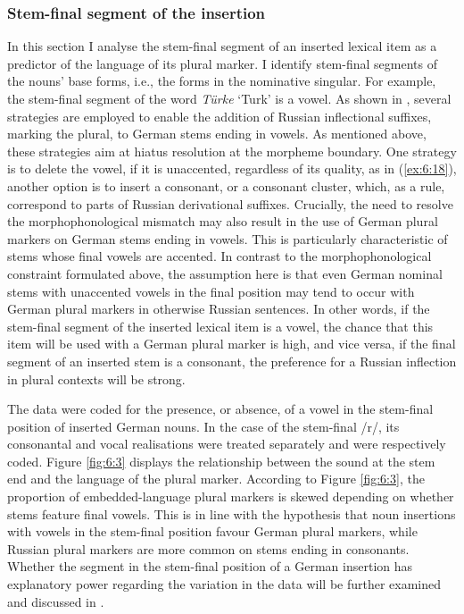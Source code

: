\subsubsection{Stem-final segment of the insertion}

\noindent In this section I analyse the stem-final segment of an inserted lexical item as a predictor of the language of its plural marker. I identify stem-final segments of the nouns’ base forms, i.e., the forms in the nominative singular. For example, the stem-final segment of the word \textit{Türke} `Turk' is a vowel. As shown in , several strategies are employed to enable the addition of Russian inflectional suffixes, marking the plural, to German stems ending in vowels. As mentioned above, these strategies aim at hiatus resolution at the morpheme boundary. One strategy is to delete the vowel, if it is unaccented, regardless of its quality, as in (\ref{ex:6:18}), another option is to insert a consonant, or a consonant cluster, which, as a rule, correspond to parts of Russian derivational suffixes. Crucially, the need to resolve the morphophonological mismatch may also result in the use of German plural markers on German stems ending in vowels. This is particularly characteristic of stems whose final vowels are accented. In contrast to the morphophonological constraint formulated above, the assumption here is that even German nominal stems with unaccented vowels in the final position may tend to occur with German plural markers in otherwise Russian sentences. In other words, if the stem-final segment of the inserted lexical item is a vowel, the chance that this item will be used with a German plural marker is high, and vice versa, if the final segment of an inserted stem is a consonant, the preference for a Russian inflection in plural contexts will be strong.

The data were coded for the presence, or absence, of a vowel in the stem-final position of inserted German nouns. In the case of the stem-final /r/, its consonantal and vocal realisations were treated separately and were respectively coded. Figure \ref{fig:6:3} displays the relationship between the sound at the stem end and the language of the plural marker. According to Figure \ref{fig:6:3}, the proportion of embedded-language plural markers is skewed depending on whether stems feature final vowels. This is in line with the hypothesis that noun insertions with vowels in the stem-final position favour German plural markers, while Russian plural markers are more common on stems ending in consonants. Whether the segment in the stem-final position of a German insertion has explanatory power regarding the variation in the data will be further examined and discussed in .

